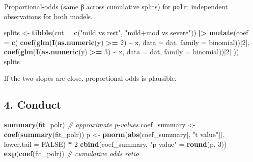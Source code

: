 \documentclass[
]{article}
\newenvironment{Shaded}{\begin{snugshade}}{\end{snugshade}}
\newcommand{\AttributeTok}[1]{\textcolor[rgb]{0.13,0.29,0.53}{#1}}
\newcommand{\CommentTok}[1]{\textcolor[rgb]{0.56,0.35,0.01}{\textit{#1}}}
\newcommand{\ConstantTok}[1]{\textcolor[rgb]{0.56,0.35,0.01}{#1}}
\newcommand{\DecValTok}[1]{\textcolor[rgb]{0.00,0.00,0.81}{#1}}
\newcommand{\FunctionTok}[1]{\textcolor[rgb]{0.13,0.29,0.53}{\textbf{#1}}}
\newcommand{\NormalTok}[1]{#1}
\newcommand{\OtherTok}[1]{\textcolor[rgb]{0.56,0.35,0.01}{#1}}
\newcommand{\SpecialCharTok}[1]{\textcolor[rgb]{0.81,0.36,0.00}{\textbf{#1}}}
\newcommand{\StringTok}[1]{\textcolor[rgb]{0.31,0.60,0.02}{#1}}
\begin{document}
Proportional-odds (same β across cumulative splits) for \texttt{polr};
independent observations for both models.

\begin{Shaded}
\begin{Highlighting}[]
\NormalTok{splits }\OtherTok{\textless{}{-}} \FunctionTok{tibble}\NormalTok{(}\AttributeTok{cut =} \FunctionTok{c}\NormalTok{(}\StringTok{"mild vs rest"}\NormalTok{, }\StringTok{"mild+mod vs severe"}\NormalTok{)) }\SpecialCharTok{|\textgreater{}}
  \FunctionTok{mutate}\NormalTok{(}\AttributeTok{coef =} \FunctionTok{c}\NormalTok{(}
    \FunctionTok{coef}\NormalTok{(}\FunctionTok{glm}\NormalTok{(}\FunctionTok{I}\NormalTok{(}\FunctionTok{as.numeric}\NormalTok{(y) }\SpecialCharTok{\textgreater{}=} \DecValTok{2}\NormalTok{) }\SpecialCharTok{\textasciitilde{}}\NormalTok{ x, }\AttributeTok{data =}\NormalTok{ dat, }\AttributeTok{family =}\NormalTok{ binomial))[}\DecValTok{2}\NormalTok{],}
    \FunctionTok{coef}\NormalTok{(}\FunctionTok{glm}\NormalTok{(}\FunctionTok{I}\NormalTok{(}\FunctionTok{as.numeric}\NormalTok{(y) }\SpecialCharTok{\textgreater{}=} \DecValTok{3}\NormalTok{) }\SpecialCharTok{\textasciitilde{}}\NormalTok{ x, }\AttributeTok{data =}\NormalTok{ dat, }\AttributeTok{family =}\NormalTok{ binomial))[}\DecValTok{2}\NormalTok{]}
\NormalTok{  ))}
\NormalTok{splits}
\end{Highlighting}
\end{Shaded}

If the two slopes are close, proportional odds is plausible.

\subsection{4. Conduct}\label{conduct}

\begin{Shaded}
\begin{Highlighting}[]
\FunctionTok{summary}\NormalTok{(fit\_polr)}
\CommentTok{\# approximate p{-}values}
\NormalTok{coef\_summary }\OtherTok{\textless{}{-}} \FunctionTok{coef}\NormalTok{(}\FunctionTok{summary}\NormalTok{(fit\_polr))}
\NormalTok{p }\OtherTok{\textless{}{-}} \FunctionTok{pnorm}\NormalTok{(}\FunctionTok{abs}\NormalTok{(coef\_summary[, }\StringTok{"t value"}\NormalTok{]), }\AttributeTok{lower.tail =} \ConstantTok{FALSE}\NormalTok{) }\SpecialCharTok{*} \DecValTok{2}
\FunctionTok{cbind}\NormalTok{(coef\_summary, }\StringTok{"p value"} \OtherTok{=} \FunctionTok{round}\NormalTok{(p, }\DecValTok{3}\NormalTok{))}
\FunctionTok{exp}\NormalTok{(}\FunctionTok{coef}\NormalTok{(fit\_polr))  }\CommentTok{\# cumulative odds ratio}
\end{Highlighting}
\end{Shaded}
\end{document}

